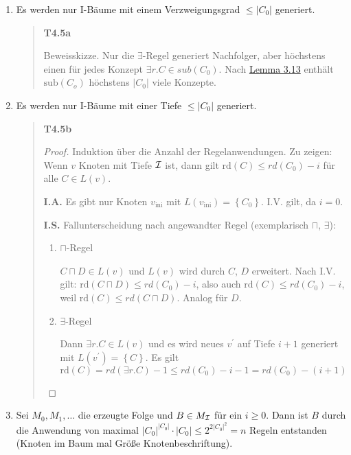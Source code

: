 \begin{enumerate}
\def\labelenumi{\arabic{enumi}.}
\item
  Es werden nur I-Bäume mit einem Verzweigungsgrad
  $\leq \left| C_{0} \right|$ generiert.

\begin{quote}
\textbf{T4.5a}

Beweisskizze. Nur die $\exists$-Regel generiert Nachfolger, aber
höchstens einen für jedes Konzept $\exists r.C \in sub(C_{0})$. Nach
\protect\hyperlink{lemma-3.13}{Lemma 3.13} enthält
$\text{sub}\left( C_{o} \right)$ höchstens $\left| C_{0} \right|$
viele Konzepte.
\end{quote}

\def\labelenumi{\arabic{enumi}.}
\item
  Es werden nur I-Bäume mit einer Tiefe $\leq \left| C_{0} \right|$
  generiert.

\begin{quote}
\textbf{T4.5b}
\begin{proof}

Induktion über die Anzahl der Regelanwendungen. Zu zeigen: Wenn $v$
Knoten mit Tiefe $\mathcal{I}$ ist, dann gilt
$\text{rd}\left( C \right) \leq rd\left( C_{0} \right) - i$ für alle
$C \in L\left( v \right)$.

\textbf{I.A.} Es gibt nur Knoten $v_{\text{ini}}$ mit
$L\left( v_{\text{ini}} \right) = \left\{ C_{0} \right\}$. I.V. gilt,
da $i = 0$.

\textbf{I.S.} Fallunterscheidung nach angewandter Regel (exemplarisch
$\sqcap$, $\exists$):

\begin{enumerate}
\def\labelenumi{\alph{enumi}.}
\item
  $\sqcap$-Regel

$C \sqcap D \in L(v)$ und $L(v)$ wird durch $C$, $D$ erweitert.
Nach I.V. gilt:
$\text{rd}\left( C \sqcap D \right) \leq rd\left( C_{0} \right) - i$,
also auch $\text{rd}\left( C \right) \leq rd\left( C_{0} \right) - i$,
weil $\text{rd}\left( C \right) \leq rd\left( C \sqcap D \right)$.
Analog für $D$.

\def\labelenumi{\alph{enumi}.}
\item
  $\exists$-Regel

Dann $\exists r.C \in L\left( v \right)$ und es wird neues $v^{'}$
auf Tiefe $i + 1$ generiert mit
$L\left( v^{'} \right) = \left\{ C \right\}$. Es gilt
$\text{rd}\left( C \right) = rd\left( \exists r.C \right) - 1 \leq rd\left( C_{0} \right) - i - 1 = rd\left( C_{0} \right) - (i + 1)$
 \end{enumerate}
\end{proof}
\end{quote}

\item
  Sei $M_{0},M_{1},\ldots$ die erzeugte Folge und $B \in M_{\mathcal{I}}$ für
  ein $i \geq 0$. Dann ist $B$ durch die Anwendung von maximal
  $\left| C_{0} \right|^{\left| C_{0} \right|} \cdot \left| C_{0} \right| \leq 2^{2\left| C_{0} \right|^{2}} = n$ Regeln entstanden (Knoten im Baum mal Größe Knotenbeschriftung).

\end{enumerate}

